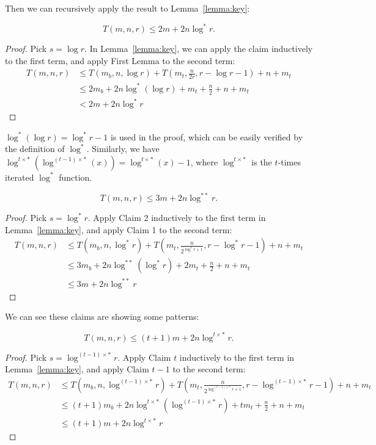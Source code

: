 Then we can recursively apply the result to Lemma~\ref{lemma:key}:

\begin{lemma}[Claim 1]
	\[ T(m,n,r) \leq 2m + 2n\log^* r .\]\label{lemma:claim1}
\end{lemma}
\begin{proof}
	Pick $s = \log r$.
	In Lemma~\ref{lemma:key}, we can apply the claim inductively to the first term, and apply First Lemma to the second term:
	\begin{align*}
		T(m,n,r) & \leq T(m_b, n, \log r) + T(m_t, \frac{n}{2r}, r-\log r - 1) + n + m_t \\
		         & \leq 2m_b + 2n\log^* (\log r) + m_t + \frac{n}{2} + n + m_t           \\
		         & < 2m + 2n\log^* r
	\end{align*}
\end{proof}

$\log^*(\log r) = \log^* r - 1$ is used in the proof, which can be easily verified by the definition of $\log^*$. Similarly, we have $\log^{t\times *}(\log^{(t-1)\times *}(x)) = \log^{t\times *}(x) - 1$, where $\log^{t\times *}$ is the $t$-times iterated $\log^*$ function.

\begin{lemma}[Claim 2]
	\[ T(m,n,r) \leq 3m + 2n\log^{**} r.\]\label{lemma:claim2}
\end{lemma}
\begin{proof}
	Pick $s = \log^* r$. Apply Claim 2 inductively to the first term in Lemma~\ref{lemma:key}, and apply Claim 1 to the second term:
	\begin{align*}
		T(m,n,r) & \leq T(m_b, n, \log^* r) + T(m_t, \frac{n}{2^{\log^* r + 1}}, r-\log^* r - 1) + n + m_t \\
		         & \leq 3m_b + 2n\log^{**} (\log^* r) + 2m_t + \frac{n}{2} + n + m_t                       \\
		         & \leq 3m + 2n\log^{**} r
	\end{align*}
\end{proof}

We can see these claims are showing some patterns:
\pagebreak
\begin{lemma}[Claim $t$]
	\[ T(m,n,r) \leq (t+1)m + 2n\log^{t\times *} r.\]\label{lemma:claimt}
\end{lemma}
\begin{proof}
	Pick $s = \log^{(t-1)\times *} r$. Apply Claim $t$ inductively to the first term in Lemma~\ref{lemma:key}, and apply Claim $t-1$ to the second term:
	\begin{align*}
		T(m,n,r) & \leq T(m_b, n, \log^{(t-1)\times *} r) + T(m_t, \frac{n}{2^{\log^{(t-1)\times *} r + 1}}, r-\log^{(t-1)\times *} r - 1) + n + m_t \\
		         & \leq (t+1)m_b + 2n\log^{t\times *} (\log^{(t-1)\times *} r) + tm_t + \frac{n}{2} + n + m_t                                        \\
		         & \leq (t+1)m + 2n\log^{t\times *} r
	\end{align*}
\end{proof}

